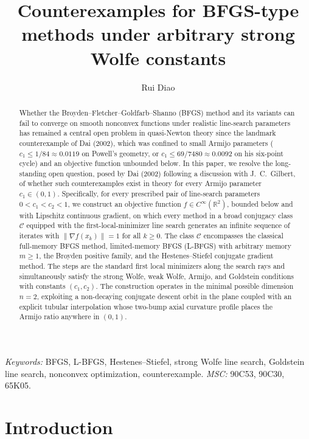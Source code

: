 \documentclass[11pt]{article}
\title{Counterexamples for {BFGS}-type methods under arbitrary strong {Wolfe} constants}
\author{Rui Diao}
\date{}
\newcommand{\R}{\mathbb{R}}
\begin{document}
\maketitle

\begin{abstract}
Whether the Broyden--Fletcher--Goldfarb--Shanno (BFGS) method and its variants can fail to converge on smooth nonconvex functions under realistic line-search parameters has remained a central open problem in quasi-Newton theory since the landmark counterexample of Dai (2002), which was confined to small Armijo parameters ($c_1 \le 1/84 \approx 0.0119$ on Powell's geometry, or $c_1 \le 69/7480 \approx 0.0092$ on his six-point cycle) and an objective function unbounded below.
In this paper, we resolve the long-standing open question, posed by Dai (2002) following a discussion with J.~C.~Gilbert, of whether such counterexamples exist in theory for every Armijo parameter $c_1 \in (0, 1)$.
Specifically, for every prescribed pair of line-search parameters $0 < c_1 < c_2 < 1$, we construct an objective function $f \in C^\infty(\R^2)$, bounded below and with Lipschitz continuous gradient, on which every method in a broad conjugacy class $\mathcal{C}$ equipped with the first-local-minimizer line search generates an infinite sequence of iterates with $\|\nabla f(x_k)\| = 1$ for all $k \ge 0$.
The class $\mathcal{C}$ encompasses the classical full-memory BFGS method, limited-memory BFGS (L-BFGS) with arbitrary memory $m \ge 1$, the Broyden positive family, and the Hestenes--Stiefel conjugate gradient method.
The steps are the standard first local minimizers along the search rays and simultaneously satisfy the strong Wolfe, weak Wolfe, Armijo, and Goldstein conditions with constants $(c_1, c_2)$.
The construction operates in the minimal possible dimension $n = 2$, exploiting a non-decaying conjugate descent orbit in the plane coupled with an explicit tubular interpolation whose two-bump axial curvature profile places the Armijo ratio anywhere in $(0, 1)$.
\end{abstract}

\noindent
{\small
\textit{Keywords:} BFGS, L-BFGS, Hestenes--Stiefel, strong Wolfe line search,
Goldstein line search, nonconvex optimization, counterexample.
\quad
\textit{MSC:} 90C53, 90C30, 65K05.
}

\section{Introduction}
\end{document}
